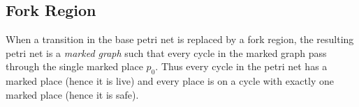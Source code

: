 \documentclass[12pt,a4paper]{article}
\begin{document}
\subsection{Fork Region}
\label{sec:fork-live-and-safe}

When a transition in the base petri net is replaced by a fork region,
the resulting petri net is a \emph{marked graph} such that every cycle
in the marked graph pass through the single marked place $p_0$. Thus
every cycle in the petri net has a marked place (hence it is live) and
every place is on a cycle with exactly one marked place (hence it is
safe).
\end{document}
